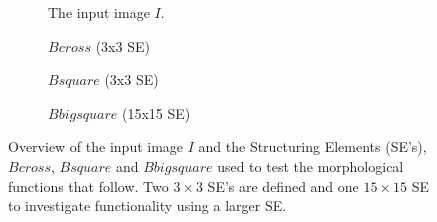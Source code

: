 \documentclass{article}
\begin{document}
\begin{figure}[H]
     \centering
     \begin{subfigure}[b]{0.75\textwidth}
         \centering
         
         \caption{The input image $I$.}
         \label{fig:wirebondmask-image}
     \end{subfigure}
     \newline
     \hfill
     \begin{subfigure}[b]{0.33\textwidth}
         \centering
         
         \caption{$Bcross$ (3x3 SE)}
         \label{fig:Bcross}
     \end{subfigure}
     \hfill
     \begin{subfigure}[b]{0.33\textwidth}
         \centering
         
         \caption{$Bsquare$  (3x3 SE)}
         \label{fig:Bsquare}
     \end{subfigure}
     \hfill
     \begin{subfigure}[b]{0.33\textwidth}
         \centering
         
         \caption{$Bbigsquare$ (15x15 SE)}
         \label{fig:Bbigsquare}
     \end{subfigure}
     
    \caption{Overview of the input image $I$ and the Structuring Elements (SE's), $Bcross$, $Bsquare$ and $Bbigsquare$ used to test the morphological functions that follow. Two $3 \times 3$ SE's are defined and one $15 \times 15$ SE to investigate functionality using a larger SE.}
    \label{fig:structuring-elements-overview}
\end{figure}
\end{document}
